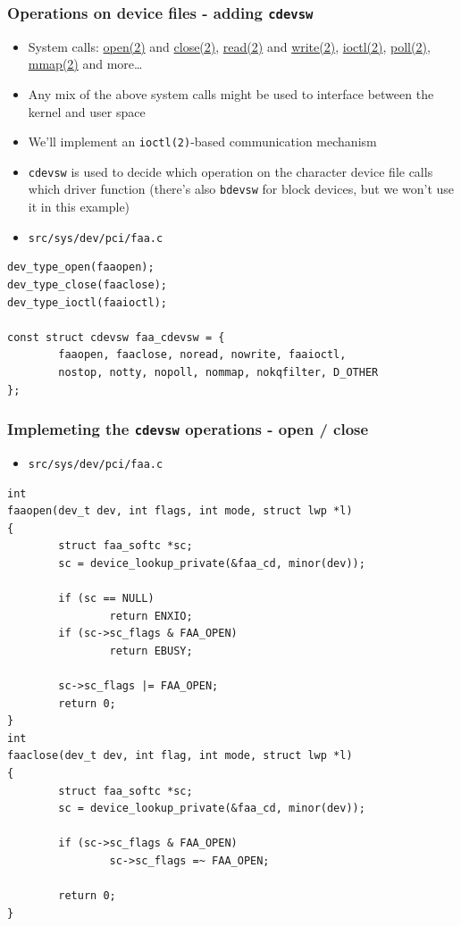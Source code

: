 \documentclass[dvipsnames,table]{beamer}
\begin{document}
\begin{frame}[fragile]
\frametitle{Operations on device files - adding {\tt cdevsw}}
\begin{itemize}
	\item System calls: \href{http://netbsd.gw.com/cgi-bin/man-cgi?read++NetBSD-current}{open(2)} and \href{http://netbsd.gw.com/cgi-bin/man-cgi?read++NetBSD-current}{close(2)}, \href{http://netbsd.gw.com/cgi-bin/man-cgi?read++NetBSD-current}{read(2)} and \href{http://netbsd.gw.com/cgi-bin/man-cgi?write++NetBSD-current}{write(2)}, \href{http://netbsd.gw.com/cgi-bin/man-cgi?write++NetBSD-current}{ioctl(2)}, \href{http://netbsd.gw.com/cgi-bin/man-cgi?poll++NetBSD-current}{poll(2)}, \href{http://netbsd.gw.com/cgi-bin/man-cgi?write++NetBSD-current}{mmap(2)} and more\dots
	\item Any mix of the above system calls might be used to interface between the kernel and user space
	\item We'll implement an {\tt ioctl(2)}-based communication mechanism

	\item {\tt cdevsw} is used to decide which operation on the character device file calls which driver function (there's also {\tt bdevsw} for block devices, but we won't use it in this example)
\end{itemize}
\begin{itemize}
	\item {\tt src/sys/dev/pci/faa.c}
\end{itemize}
\begin{lstlisting}
dev_type_open(faaopen);
dev_type_close(faaclose);
dev_type_ioctl(faaioctl);

const struct cdevsw faa_cdevsw = {
        faaopen, faaclose, noread, nowrite, faaioctl,
        nostop, notty, nopoll, nommap, nokqfilter, D_OTHER
};
\end{lstlisting}
\end{frame}


\begin{frame}[fragile]
\frametitle{Implemeting the {\tt cdevsw} operations - open / close}
\begin{itemize}
	\item {\tt src/sys/dev/pci/faa.c}
\end{itemize}
\begin{lstlisting}
int
faaopen(dev_t dev, int flags, int mode, struct lwp *l)
{
        struct faa_softc *sc;
        sc = device_lookup_private(&faa_cd, minor(dev));

        if (sc == NULL)
                return ENXIO;
        if (sc->sc_flags & FAA_OPEN)
                return EBUSY;

        sc->sc_flags |= FAA_OPEN;
        return 0;
}
int
faaclose(dev_t dev, int flag, int mode, struct lwp *l)
{
        struct faa_softc *sc;
        sc = device_lookup_private(&faa_cd, minor(dev));

        if (sc->sc_flags & FAA_OPEN)
                sc->sc_flags =~ FAA_OPEN;

        return 0;
}
\end{lstlisting}
\end{frame}
\end{document}
